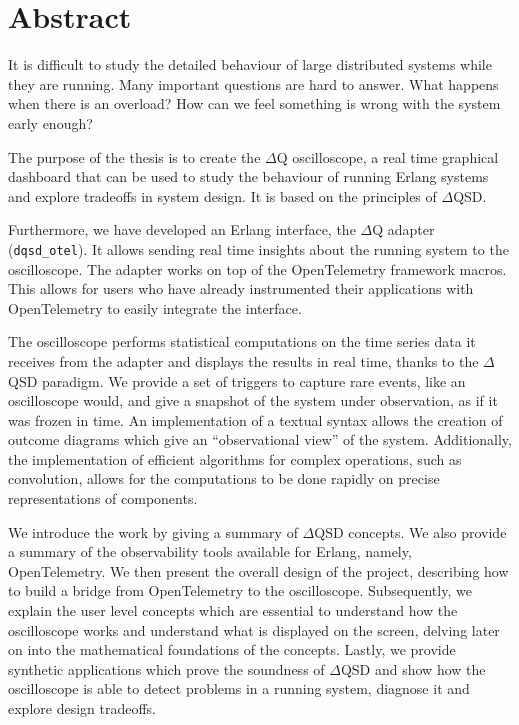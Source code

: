 \chapter*{Abstract}
    It is difficult to study the detailed behaviour of large distributed systems while they are running. Many important questions are hard to answer. What happens when there is an overload? How can we feel something is wrong with the system early enough?

    The purpose of the thesis is to create the $\Delta$Q oscilloscope, a real time graphical dashboard that can be used to study the behaviour of running Erlang systems and explore tradeoffs in system design. It is based on the principles of $\Delta$QSD.
  
    Furthermore, we have developed an Erlang interface, the $\Delta$Q adapter (\texttt{dqsd\_otel}). It allows sending real time insights about the running system to the oscilloscope. The adapter works on top of the OpenTelemetry framework macros. This allows for users who have already instrumented their applications with OpenTelemetry to easily integrate the interface.

    The oscilloscope performs statistical computations on the time series data it receives from the adapter and displays the results in real time, thanks to the $\Delta$QSD paradigm. We provide a set of triggers to capture rare events, like an oscilloscope would, and give a snapshot of the system under observation, as if it was frozen in time. An implementation of a textual syntax allows the creation of outcome diagrams which give an ``observational view'' of the system. Additionally, the implementation of efficient algorithms for complex operations, such as convolution, allows for the computations to be done rapidly on precise representations of components.

    We introduce the work by giving a summary of $\Delta$QSD concepts. We also provide a summary of the observability tools available for Erlang, namely, OpenTelemetry. We then present the overall design of the project, describing how to build a bridge from OpenTelemetry to the oscilloscope. Subsequently, we explain the user level concepts which are essential to understand how the oscilloscope works and understand what is displayed on the screen, delving later on into the mathematical foundations of the concepts. Lastly, we provide synthetic applications which prove the soundness of $\Delta$QSD and show how the oscilloscope is able to detect problems in a running system, diagnose it and explore design tradeoffs.



